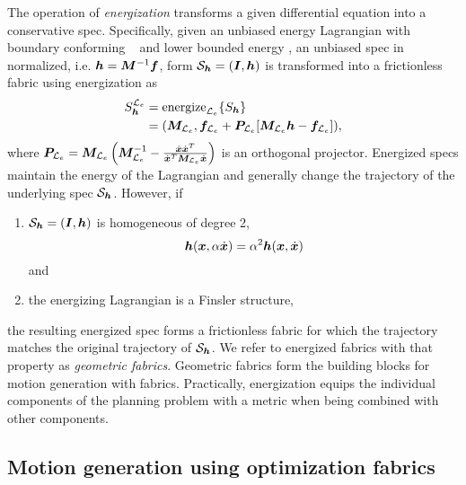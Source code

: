 The operation of \textit{energization} transforms a given differential equation into
a conservative spec.
Specifically, given an unbiased energy Lagrangian \le{} with boundary conforming
\Me{}~\cite[Definition~4.6]{Ratliff2020} and
lower bounded energy \he{}, an unbiased spec in normalized,
i.e. $\bm{h} = \bm{M}^{-1}\bm{f}$,
form $\mathcal{S}_{\bm{h}} = (\bm{I},\bm{h})$
is transformed into a frictionless fabric using energization as
\begin{equation}
  \begin{split}
  S_{\bm{h}}^{\mathcal{L}_e} &= \text{energize}_{\mathcal{L}_e}\{S_{\bm{h}}\} \\
    &= (\bm{M}_{\mathcal{L}_e}, \bm{f}_{\mathcal{L}_e} + \bm{P}_{\mathcal{L}_e}[\bm{M}_{\mathcal{L}_e}\bm{h} - \bm{f}_{\mathcal{L}_e}]), 
  \end{split}
\end{equation}
where $\bm{P}_{\mathcal{L}_e} = \bm{M}_{\mathcal{L}_e}\left(\bm{M}_{\mathcal{L}_e}^{-1} - \frac{\dot{\bm{x}}\dot{\bm{x}}^T}{\dot{\bm{x}}^T\bm{M}_{\mathcal{L}_e}\dot{\bm{x}}}\right)$ is an
orthogonal projector.
Energized specs maintain the energy of the Lagrangian and generally change
the trajectory of the underlying spec $\mathcal{S}_{\bm{h}}$.
However, if 
\begin{enumerate}
  \item $\mathcal{S}_{\bm{h}} = (\bm{I},\bm{h})$ is homogeneous of degree 2,
    \begin{equation}\bm{h}(\bm{x}, \alpha\dot{\bm{x}}) = \alpha^2\bm{h}(\bm{x}, \dot{\bm{x}})\label{eq:homogeneous}\end{equation}
    and
  \item the energizing Lagrangian is a Finsler structure, 
\end{enumerate}
the resulting energized spec forms a frictionless fabric for which the trajectory matches
the original trajectory of $\mathcal{S}_{\bm{h}}$. We refer to energized fabrics with that
property as \textit{geometric fabrics}. Geometric fabrics form the building blocks for
motion generation with \ac{fabrics}.
Practically, energization equips the individual components of the planning problem
with a metric when being combined with other components.


\subsection{Motion generation using optimization fabrics}%
\label{sub:trajectory_generation_using_optimization_fabrics}

